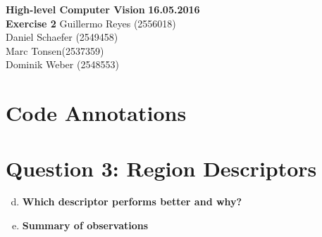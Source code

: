 \documentclass[12pt]{article}
\begin{document}

\noindent
{\Large \textbf{High-level Computer Vision}} \hfill \textbf{16.05.2016}\\
{\Large \textbf{Exercise 2}} 
\raggedleft \hfill Guillermo Reyes (2556018)\\
\hfill Daniel Schaefer (2549458)\\
\hfill Marc Tonsen(2537359)\\
\hfill Dominik Weber (2548553)\\

\raggedright


\section*{Code Annotations}




\section*{Question 3: Region Descriptors}

\begin{enumerate}[a)]
	\setcounter{enumi}{3}
	\item 	
	\textbf{Which descriptor performs better and why?}\\
	
	\item
	\textbf{Summary of observations}\\

\end{enumerate}

\newpage
\end{document}
